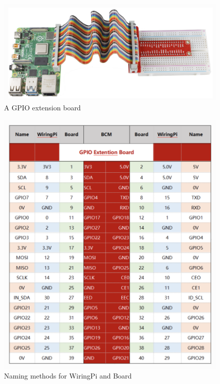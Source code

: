 \begin{figure}
    \begin{center}
        \includegraphics[scale=0.55]{Figs/gpio.png}    
    \end{center}
    \caption{A GPIO extension board \cite{gpio}}
    \label{fig:gpio}
\end{figure}

\begin{figure}
    \begin{center}
        \includegraphics[scale=0.45]{Figs/gpiotable.png}    
    \end{center}
    \caption{Naming methods for WiringPi and Board \cite{gpio}}
    \label{fig:gpiotable}
\end{figure}

